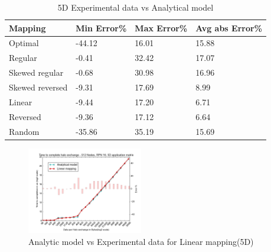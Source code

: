 \documentclass{acm_proc_article-sp}
\begin{document}
\begin{table}
  \caption{5D Experimental data vs Analytical model
    \label{table:data vs model 5d}}
  {\footnotesize
    \begin{tabular}{ | l | l | l | p{1.5cm} |}
    \hline
    Mapping         &    Min Error\% &   Max Error\% & Avg abs Error\%\\ \hline
    Optimal         &         -44.12 & 16.01 & 15.88\\ \hline
    Regular         &         -0.41  & 32.42 & 17.07\\ \hline
    Skewed regular  &         -0.68  & 30.98 & 16.96\\ \hline
    Skewed reversed &         -9.31  & 17.69 & 8.99\\ \hline
    Linear          &         -9.44  & 17.20 & 6.71\\ \hline
    Reversed        &         -9.36  & 17.12 & 6.64\\ \hline
    Random          &         -35.86 & 35.19 & 15.69\\ \hline

    \hline
    \end{tabular}
  }
\end{table}






\begin{figure}
  \center
  \includegraphics[width=0.45\textwidth]{mappings/5d_linear_model.png}
  \caption{Analytic model vs Experimental data for Linear mapping(5D)}
    \label{fig:5D_linear_mapping}
\end{figure}
\end{document}
